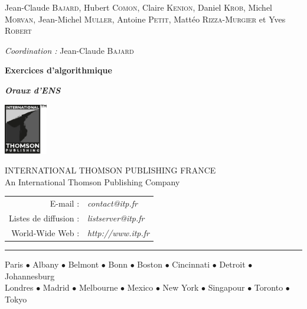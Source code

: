 \begin{titlepage}
\begin{center}
    {\Large Jean-Claude \textsc{Bajard}, Hubert \textsc{Comon}, Claire \textsc{Kenion}, Daniel \textsc{Krob}, Michel \textsc{Morvan}, Jean-Michel \textsc{Muller}, Antoine \textsc{Petit}, Mattéo \textsc{Rizza-Murgier} et Yves \textsc{Robert}}
    \vspace{.8cm}

    {\Large\textit{Coordination :} Jean-Claude \textsc{Bajard}}
    \vspace{3.3cm}

    {\fontsize{25pt}{0pt}\bfseries Exercices d'algorithmique}
    \vspace{.7cm}

    {\fontsize{18pt}{0pt}\bfseries\itshape Oraux d'ENS}


    \vfill

    \includegraphics[height=2.2cm]{thomson-publishing}
    \smallskip

    \uppercase{International Thomson Publishing France}\\
    An International Thomson Publishing Company
    \medskip

    \begin{tabular}{r l}
        E-mail : & \textit{contact@itp.fr}\\
        Listes de diffusion : & \textit{listserver@itp.fr}\\
        World-Wide Web : & \textit{http://www.itp.fr}
    \end{tabular}
    \hrule\vspace{4pt}
   \textsf{Paris $\bullet$ Albany $\bullet$ Belmont $\bullet$ Bonn $\bullet$ Boston $\bullet$ Cincinnati $\bullet$ Detroit $\bullet$ Johannesburg\\
   Londres $\bullet$ Madrid $\bullet$ Melbourne $\bullet$ Mexico $\bullet$ New York $\bullet$ Singapour $\bullet$ Toronto $\bullet$ Tokyo}
   \end{center}
\end{titlepage}